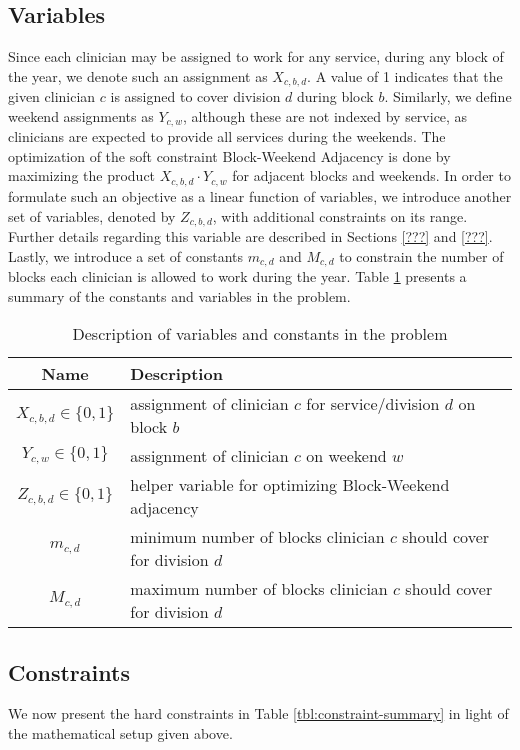 \subsection{Variables}
Since each clinician may be assigned to work for any service, during any block of the year, we denote such an assignment as $X_{c, b, d}$. A value of 1 indicates that the given clinician $c$ is assigned to cover division $d$ during block $b$. Similarly, we define weekend assignments as $Y_{c, w}$, although these are not indexed by service, as clinicians are expected to provide all services during the weekends. The optimization of the soft constraint Block-Weekend Adjacency is done by maximizing the product $X_{c, b, d} \cdot Y_{c, w}$ for adjacent blocks and weekends. In order to formulate such an objective as a linear function of variables, we introduce another set of variables, denoted by $Z_{c, b, d}$, with additional constraints on its range. Further details regarding this variable are described in Sections \ref{???} and \ref{???}. Lastly, we introduce a set of constants $m_{c, d}$ and $M_{c, d}$ to constrain the number of blocks each clinician is allowed to work during the year. Table \ref{tbl:variables-constants} presents a summary of the constants and variables in the problem.

\begin{table}[h]
	\centering
	\begin{tabular}{ c l }
		\hline
		\textbf{Name}              & \textbf{Description}                                                 \\ \hline
		$X_{c, b, d} \in \{0, 1\}$ & assignment of clinician $c$ for service/division $d$ on block $b$    \\
		$Y_{c, w} \in \{0, 1\}$    & assignment of clinician $c$ on weekend $w$                           \\
		$Z_{c, b, d} \in \{0, 1\}$ & helper variable for optimizing Block-Weekend adjacency               \\
		$m_{c, d}$                 & minimum number of blocks clinician $c$ should cover for division $d$ \\
		$M_{c, d}$                 & maximum number of blocks clinician $c$ should cover for division $d$
	\end{tabular}
	\caption{Description of variables and constants in the problem}
	\label{tbl:variables-constants}
\end{table}

\subsection{Constraints}
We now present the hard constraints in Table \ref{tbl:constraint-summary} in light of the mathematical setup given above.

